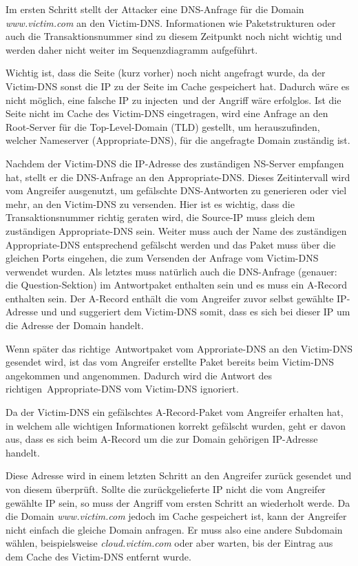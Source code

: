 \documentclass[10pt,a4paper]{article}
\begin{document}
Im ersten Schritt stellt der Attacker eine DNS-Anfrage für die Domain \emph{www.victim.com} an den Victim-DNS. Informationen wie Paketstrukturen oder auch die Transaktionsnummer sind zu diesem Zeitpunkt noch nicht wichtig und werden daher nicht weiter im Sequenzdiagramm aufgeführt.

Wichtig ist, dass die Seite (kurz vorher) noch nicht angefragt wurde, da der Victim-DNS sonst die IP zu der Seite im Cache gespeichert hat. Dadurch wäre es nicht möglich, eine falsche IP  zu \glqq injecten\grqq\ und der Angriff wäre erfolglos. Ist die Seite nicht im Cache des Victim-DNS eingetragen, wird eine Anfrage an den Root-Server für die Top-Level-Domain (TLD) gestellt, um herauszufinden, welcher Nameserver (Appropriate-DNS), für die angefragte Domain zuständig ist.

Nachdem der Victim-DNS die IP-Adresse des zuständigen NS-Server empfangen hat, stellt er die DNS-Anfrage an den Appropriate-DNS. Dieses Zeitintervall wird vom Angreifer ausgenutzt, um gefälschte DNS-Antworten zu generieren oder viel mehr, an den Victim-DNS zu versenden. Hier ist es wichtig, dass die Transaktionsnummer richtig geraten wird, die Source-IP muss gleich dem zuständigen Appropriate-DNS sein. Weiter muss auch der Name des zuständigen Appropriate-DNS entsprechend gefälscht werden und das Paket muss über die gleichen Ports eingehen, die zum Versenden der Anfrage vom Victim-DNS verwendet wurden. Als letztes muss natürlich auch die DNS-Anfrage (genauer: die Question-Sektion) im Antwortpaket enthalten sein und es muss ein A-Record enthalten sein. Der A-Record enthält die vom Angreifer zuvor selbst gewählte IP-Adresse und und suggeriert dem Victim-DNS somit, dass es sich bei dieser IP um die Adresse der Domain handelt.

Wenn später das \glqq richtige\grqq\ Antwortpaket vom Approriate-DNS an den Victim-DNS gesendet wird, ist das vom Angreifer erstellte Paket bereits beim Victim-DNS angekommen und angenommen. Dadurch wird die Antwort des \glqq richtigen\grqq\ Appropriate-DNS vom Victim-DNS ignoriert. 

Da der Victim-DNS ein gefälschtes A-Record-Paket vom Angreifer erhalten hat, in welchem alle wichtigen Informationen korrekt gefälscht wurden, geht er davon aus, dass es sich beim A-Record um die zur Domain gehörigen IP-Adresse handelt.

Diese Adresse wird in einem letzten Schritt an den Angreifer zurück gesendet und von diesem überprüft. Sollte die zurückgelieferte IP nicht die vom Angreifer gewählte IP sein, so muss der Angriff vom ersten Schritt an wiederholt werde. Da die Domain \emph{www.victim.com} jedoch im Cache gespeichert ist, kann der Angreifer nicht einfach die gleiche Domain anfragen. Er muss also eine andere Subdomain wählen, beispielsweise \emph{cloud.victim.com} oder aber warten, bis der Eintrag aus dem Cache des Victim-DNS entfernt wurde.
\end{document}

